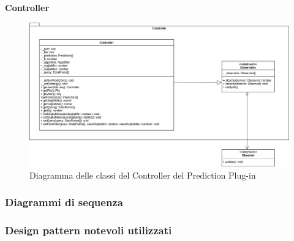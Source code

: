 \textbf{Controller}
\begin{figure}[H]
\centering
\includegraphics[scale=0.4]{../../Diagrams/Classes_diagrams/plugin_controller.png}
\caption{Diagramma delle classi del Controller del Prediction Plug-in}
\end{figure}

\subsubsection{Diagrammi di sequenza}

\subsubsection{Design pattern notevoli utilizzati}

